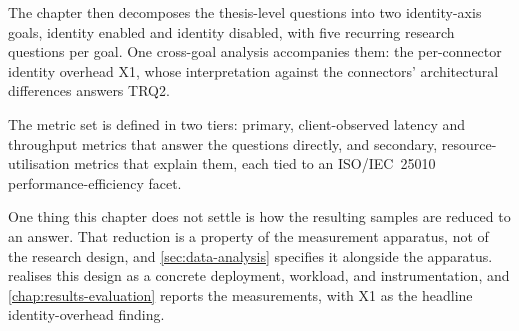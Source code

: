 The chapter then decomposes the thesis-level questions into two identity-axis goals, identity enabled and identity disabled, with five recurring research questions per goal. One cross-goal analysis accompanies them: the per-connector identity overhead X1, whose interpretation against the connectors' architectural differences answers TRQ2.

The metric set is defined in two tiers: primary, client-observed latency and throughput metrics that answer the questions directly, and secondary, resource-utilisation metrics that explain them, each tied to an ISO/IEC~25010 performance-efficiency facet.

One thing this chapter does not settle is how the resulting samples are reduced to an answer. That reduction is a property of the measurement apparatus, not of the research design, and \cref{sec:data-analysis} specifies it alongside the apparatus.  realises this design as a concrete deployment, workload, and instrumentation, and \cref{chap:results-evaluation} reports the measurements, with X1 as the headline identity-overhead finding.
